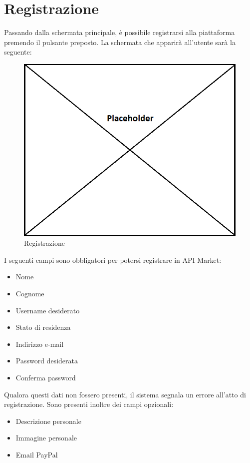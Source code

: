 \newpage
\section{Registrazione}

Passando dalla schermata principale, è possibile registrarsi alla piattaforma premendo il pulsante preposto. La schermata che apparirà all'utente sarà la seguente:

\label{Registrazione}
\begin{figure}[H]
	\centering
	\includegraphics[scale=0.45]{img/placeholder.png}
	\caption{Registrazione}
\end{figure}

I seguenti campi sono obbligatori per potersi registrare in API Market:
\begin{itemize}
	\item Nome
	\item Cognome
	\item Username desiderato
	\item Stato di residenza
	\item Indirizzo e-mail
	\item Password desiderata
	\item Conferma password
\end{itemize}

Qualora questi dati non fossero presenti, il sistema segnala un errore all'atto di registrazione. Sono presenti inoltre dei campi opzionali:

\begin{itemize}
	\item Descrizione personale
	\item Immagine personale
	\item Email PayPal
\end{itemize}

